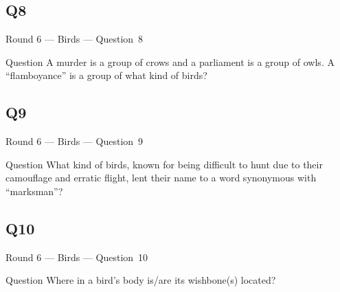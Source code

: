 \documentclass[11pt]{beamer}
\begin{document}
\subsection*{Q8}
\begin{frame}[t]{Round 6 --- Birds --- \mbox{Question 8}}
\vspace{-0.5em}
\begin{block}{Question}
A murder is a group of crows and a parliament is a group of owls. A ``flamboyance'' is a group of what kind of birds?
\end{block}
\end{frame}
\subsection*{Q9}
\begin{frame}[t]{Round 6 --- Birds --- \mbox{Question 9}}
\vspace{-0.5em}
\begin{block}{Question}
What kind of birds, known for being difficult to hunt due to their camouflage and erratic flight, lent their name to a word synonymous with ``marksman''?
\end{block}
\end{frame}
\subsection*{Q10}
\begin{frame}[t]{Round 6 --- Birds --- \mbox{Question 10}}
\vspace{-0.5em}
\begin{block}{Question}
Where in a bird's body is/are its wishbone(s) located?
\end{block}
\end{frame}
\end{document}
